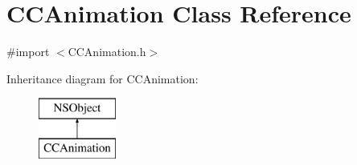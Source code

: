 \hypertarget{interface_c_c_animation}{\section{C\-C\-Animation Class Reference}
\label{interface_c_c_animation}
}


{\ttfamily \#import $<$C\-C\-Animation.\-h$>$}

Inheritance diagram for C\-C\-Animation\-:\begin{figure}[H]
\begin{center}
\leavevmode
\includegraphics[height=2.000000cm]{interface_c_c_animation}
\end{center}
\end{figure}
